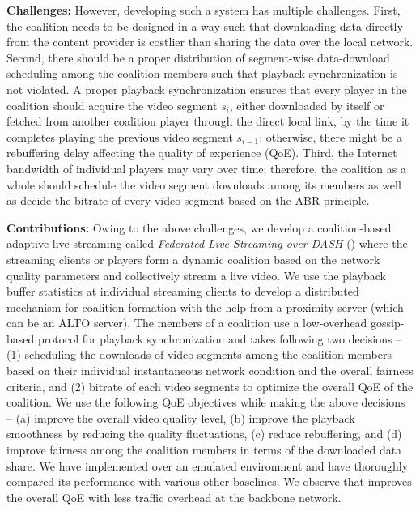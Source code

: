 \textbf{Challenges:} However, developing such a system has multiple challenges. First, the coalition needs to be designed in a way such that downloading data directly from the content provider is costlier than sharing the data over the local network. Second, there should be a proper distribution of segment-wise data-download scheduling among the coalition members such that playback synchronization is not violated. A proper playback synchronization ensures that every player in the coalition should acquire the video segment $s_{i}$, either downloaded by itself or fetched from another coalition player through the direct local link, by the time it completes playing the previous video segment $s_{i-1}$; otherwise, there might be a rebuffering delay affecting the quality of experience (QoE). Third, the Internet bandwidth of individual players may vary over time; therefore, the coalition as a whole should schedule the video segment downloads among its members as well as decide the bitrate of every video segment based on the ABR principle.

\textbf{Contributions:} Owing to the above challenges, we develop a coalition-based adaptive live streaming  called \textit{Federated Live Streaming over DASH} (\our) where the streaming clients or players form a dynamic coalition based on the network quality parameters and collectively stream a live video. We use the playback buffer statistics at individual streaming clients to develop a distributed mechanism for coalition formation with the help from a proximity server (which can be an ALTO server). The members of a coalition use a low-overhead gossip-based protocol for playback synchronization and takes following two decisions -- (1) scheduling the downloads of video segments among the coalition members based on their individual instantaneous network condition and the overall fairness criteria, and (2) bitrate of each video segments to optimize the overall QoE of the coalition. We use the following QoE objectives while making the above decisions -- (a) improve the overall video quality level, (b) improve the playback smoothness by reducing the quality fluctuations, (c) reduce rebuffering, and (d) improve fairness  among the coalition members in terms of the downloaded data share. We have implemented {\our} over an emulated environment and have thoroughly compared its performance with various other baselines. We observe that {\our} improves the overall QoE with less traffic overhead at the backbone network.
